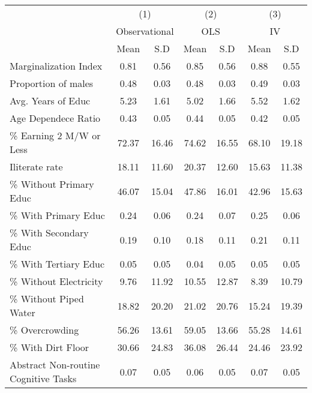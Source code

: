 {
\def\sym#1{\ifmmode^{#1}\else\(^{#1}\)\fi}
\begin{tabular}{l*{3}{cc}}
\hline\hline
                    &\multicolumn{2}{c}{(1)}  &\multicolumn{2}{c}{(2)}  &\multicolumn{2}{c}{(3)}  \\
                    &\multicolumn{2}{c}{Observational}&\multicolumn{2}{c}{OLS}  &\multicolumn{2}{c}{IV}   \\
                    &        Mean&         S.D&        Mean&         S.D&        Mean&         S.D\\
\hline
Marginalization Index&        0.81&        0.56&        0.85&        0.56&        0.88&        0.55\\
Proportion of males &        0.48&        0.03&        0.48&        0.03&        0.49&        0.03\\
Avg. Years of Educ  &        5.23&        1.61&        5.02&        1.66&        5.52&        1.62\\
Age Dependece Ratio &        0.43&        0.05&        0.44&        0.05&        0.42&        0.05\\
\% Earning 2 M/W or Less&       72.37&       16.46&       74.62&       16.55&       68.10&       19.18\\
Iliterate rate      &       18.11&       11.60&       20.37&       12.60&       15.63&       11.38\\
\% Without Primary Educ&       46.07&       15.04&       47.86&       16.01&       42.96&       15.63\\
\% With Primary Educ&        0.24&        0.06&        0.24&        0.07&        0.25&        0.06\\
\% With Secondary Educ&        0.19&        0.10&        0.18&        0.11&        0.21&        0.11\\
\% With Tertiary Educ&        0.05&        0.05&        0.04&        0.05&        0.05&        0.05\\
\% Without Electricity&        9.76&       11.92&       10.55&       12.87&        8.39&       10.79\\
\% Without Piped Water&       18.82&       20.20&       21.02&       20.76&       15.24&       19.39\\
\% Overcrowding     &       56.26&       13.61&       59.05&       13.66&       55.28&       14.61\\
\% With Dirt Floor  &       30.66&       24.83&       36.08&       26.44&       24.46&       23.92\\
Abstract Non-routine Cognitive Tasks&        0.07&        0.05&        0.06&        0.05&        0.07&        0.05\\

\end{tabular}}
